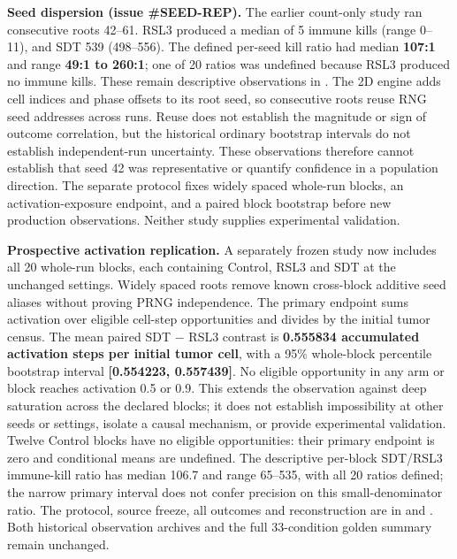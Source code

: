 \documentclass[11pt,twoside,openright]{report}
\begin{document}
\textbf{Seed dispersion (issue \#SEED-REP).} The earlier count-only study ran consecutive roots 42–61. RSL3 produced a median of 5 immune kills (range 0–11), and SDT 539 (498–556). The defined per-seed kill ratio had median \textbf{107:1} and range \textbf{49:1 to 260:1}; one of 20 ratios was undefined because RSL3 produced no immune kills. These remain descriptive observations in . The 2D engine adds cell indices and phase offsets to its root seed, so consecutive roots reuse RNG seed addresses across runs. Reuse does not establish the magnitude or sign of outcome correlation, but the historical ordinary bootstrap intervals do not establish independent-run uncertainty. These observations therefore cannot establish that seed 42 was representative or quantify confidence in a population direction. The separate protocol  fixes widely spaced whole-run blocks, an activation-exposure endpoint, and a paired block bootstrap before new production observations. Neither study supplies experimental validation.

\textbf{Prospective activation replication.} A separately frozen study now includes all 20 whole-run blocks, each containing Control, RSL3 and SDT at the unchanged settings. Widely spaced roots remove known cross-block additive seed aliases without proving PRNG independence. The primary endpoint sums activation over eligible cell-step opportunities and divides by the initial tumor census. The mean paired SDT $-$ RSL3 contrast is \textbf{0.555834 accumulated activation steps per initial tumor cell}, with a 95\% whole-block percentile bootstrap interval \textbf{[0.554223, 0.557439]}. No eligible opportunity in any arm or block reaches activation 0.5 or 0.9. This extends the observation against deep saturation across the declared blocks; it does not establish impossibility at other seeds or settings, isolate a causal mechanism, or provide experimental validation. Twelve Control blocks have no eligible opportunities: their primary endpoint is zero and conditional means are undefined. The descriptive per-block SDT/RSL3 immune-kill ratio has median 106.7 and range 65–535, with all 20 ratios defined; the narrow primary interval does not confer precision on this small-denominator ratio. The protocol, source freeze, all outcomes and reconstruction are in  and . Both historical observation archives and the full 33-condition golden summary remain unchanged.
\end{document}
